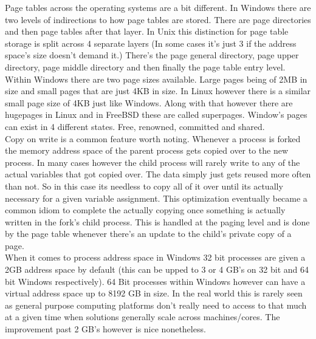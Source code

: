 \documentclass[letterpaper,10pt,draftclsnofoot,onecolumn]{IEEEtran}
\begin{document}
Page tables across the operating systems are a bit different. In Windows there are two levels of indirections to how page tables are stored. There are page directories and then page tables after that layer. In Unix this distinction for page table storage is split across 4 separate layers (In some cases it's just 3 if the address space’s size doesn’t demand it.) There's the page general directory, page upper directory, page middle directory and then finally the page table entry level. Within Windows there are two page sizes available. Large pages being of 2MB in size and small pages that are just 4KB in size. In Linux however there is a similar small page size of 4KB just like Windows. Along with that however there are hugepages in Linux and in FreeBSD these are called superpages. \cite{mccusick} Window’s pages can exist in 4 different states. Free, renowned, committed and shared.\\

Copy on write is a common feature worth noting. Whenever a process is forked the memory address space of the parent process gets copied over to the new process. In many cases however the child process will rarely write to any of the actual variables that got copied over. The data simply just gets reused more often than not. So in this case its needless to copy all of it over until its actually necessary for a given variable assignment. This optimization eventually became a common idiom to complete the actually copying once something is actually written in the fork’s child process. This is handled at the paging level and is done by the page table whenever there’s an update to the child’s private copy of a page. \cite{love}\\



When it comes to process address space in Windows 32 bit processes are given a 2GB address space by default (this can be upped to 3 or 4 GB’s on 32 bit and 64 bit Windows respectively). 64 Bit processes within Windows however can have a virtual address space up to 8192 GB in size. In the real world this is rarely seen as general purpose computing platforms don’t really need to access to that much at a given time when solutions generally scale across machines/cores. The improvement past 2 GB’s however is nice nonetheless.\\
\end{document}
